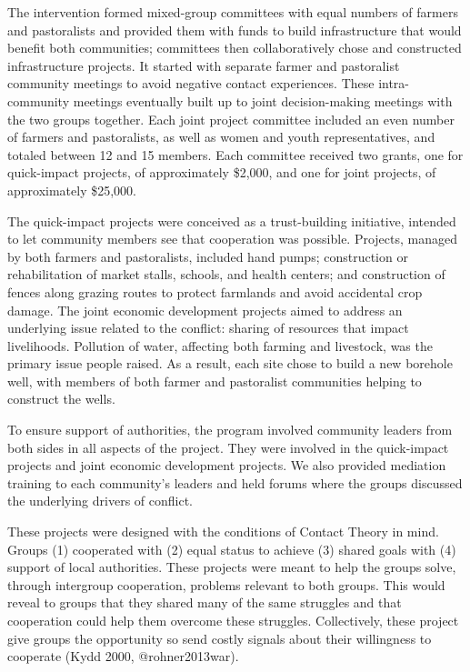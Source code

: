 \documentclass[11pt]{article}
\begin{document}
The intervention formed mixed-group committees with equal numbers of
farmers and pastoralists and provided them with funds to build
infrastructure that would benefit both communities; committees then
collaboratively chose and constructed infrastructure projects. It
started with separate farmer and pastoralist community meetings to avoid
negative contact experiences. These intra-community meetings eventually
built up to joint decision-making meetings with the two groups together.
Each joint project committee included an even number of farmers and
pastoralists, as well as women and youth representatives, and totaled
between 12 and 15 members. Each committee received two grants, one for
quick-impact projects, of approximately \$2,000, and one for joint
projects, of approximately \$25,000.

The quick-impact projects were conceived as a trust-building initiative,
intended to let community members see that cooperation was possible.
Projects, managed by both farmers and pastoralists, included hand pumps;
construction or rehabilitation of market stalls, schools, and health
centers; and construction of fences along grazing routes to protect
farmlands and avoid accidental crop damage. The joint economic
development projects aimed to address an underlying issue related to the
conflict: sharing of resources that impact livelihoods. Pollution of
water, affecting both farming and livestock, was the primary issue
people raised. As a result, each site chose to build a new borehole
well, with members of both farmer and pastoralist communities helping to
construct the wells.

To ensure support of authorities, the program involved community leaders
from both sides in all aspects of the project. They were involved in the
quick-impact projects and joint economic development projects. We also
provided mediation training to each community's leaders and held forums
where the groups discussed the underlying drivers of conflict.

These projects were designed with the conditions of Contact Theory in
mind. Groups (1) cooperated with (2) equal status to achieve (3) shared
goals with (4) support of local authorities. These projects were meant
to help the groups solve, through intergroup cooperation, problems
relevant to both groups. This would reveal to groups that they shared
many of the same struggles and that cooperation could help them overcome
these struggles. Collectively, these project give groups the opportunity
so send costly signals about their willingness to cooperate (Kydd 2000,
@rohner2013war).
\end{document}
